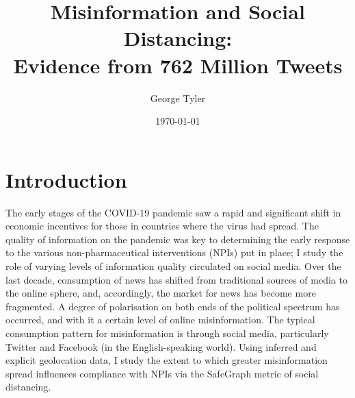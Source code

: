 \documentclass{article}
\author{George Tyler}
\date{\today}
\begin{document}
\title{Misinformation and Social Distancing: \\ Evidence from 762 Million Tweets}

\maketitle


\section{Introduction}
The early stages of the COVID-19 pandemic saw a rapid and significant shift in economic incentives for those in countries where the virus had spread. The quality of information on the pandemic was key to determining the early response to the various non-pharmaceutical interventions (NPIs) put in place; I study the role of varying levels of information quality circulated on social media. Over the last decade, consumption of news has shifted from traditional sources of media to the online sphere, and, accordingly, the market for news has become more fragmented. A degree of polarisation on both ends of the political spectrum has occurred, and with it a certain level of online misinformation. The typical consumption pattern for misinformation is through social media, particularly Twitter and Facebook (in the English-speaking world). Using inferred and explicit geolocation data, I study the extent to which greater misinformation spread influences compliance with NPIs via the SafeGraph metric of social distancing.

\end{document}
